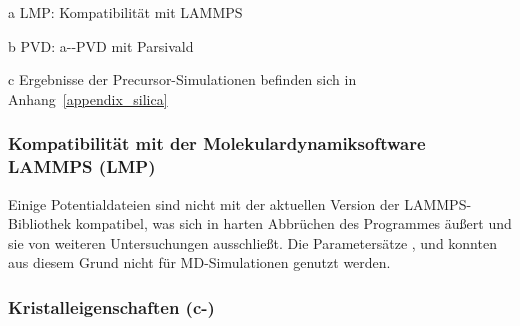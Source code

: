 \begin{table}[th]
\begin{threeparttable}

    \begin{tablenotes}[para]
      \item[a] LMP: Kompatibilität mit LAMMPS
      \item[b] PVD: a--PVD mit Parsivald
      \item[c] Ergebnisse der Precursor-Simulationen befinden sich in Anhang~\ref{appendix_silica}
    \end{tablenotes}
  \end{threeparttable}
\end{table}
\nopagebreak[4]
\subsubsection{Kompatibilität mit der Molekulardynamiksoftware LAMMPS (LMP)}

Einige Potentialdateien sind nicht mit der aktuellen Version der LAMMPS-Bibliothek kompatibel, was sich in harten Abbrüchen des Programmes äußert und sie von weiteren Untersuchungen ausschließt.
Die Parametersätze ,  und  konnten aus diesem Grund nicht für MD-Simulationen genutzt werden.

\subsubsection{Kristalleigenschaften (c-)}


